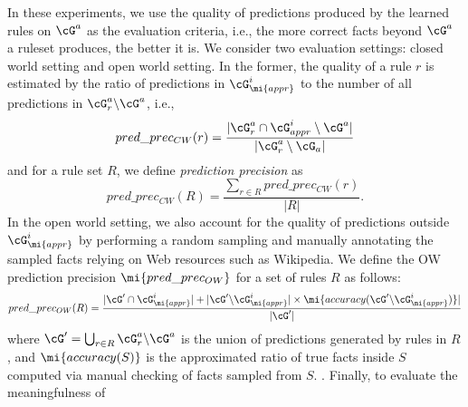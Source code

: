 In these experiments, we use the quality of predictions produced %
by the learned rules on $\cG^a$ as the evaluation criteria, i.e., the more correct facts %
beyond %
$\cG^a$ a ruleset produces, the better it is. %
We consider two evaluation settings: closed world setting and open world setting. In the former, the quality of a rule $r$ is estimated by the ratio of predictions in $\cG^i_{\mi{appr}}$ to the number of all predictions in $\cG^a_r\backslash \cG^a$, i.e., 
 \[   pred\_prec_{CW}(r) = \frac{|\cG^a_r \cap \cG^i_{appr} \setminus \cG^a|}{|\cG^a_r \setminus \cG_a|}\]
and for a rule set $R$, we define \textit{prediction precision} as
 \[   pred\_prec_{CW}(R) = \frac{\sum\limits_{r\in R} pred\_prec_{CW}(r)}{|R|}.\]
In the open world setting, we also account for the quality of predictions outside $\cG^i_{\mi{appr}}$ by performing a random sampling and manually annotating the sampled facts relying on Web resources such as Wikipedia. %
We define the OW prediction precision $\mi{pred\_prec_{OW}}$ for a set of rules $R$ as follows:
\[pred\_prec_{OW}(R) = \frac{|\cG'\cap \cG^i_{\mi{appr}}|+|\cG'\backslash \cG^i_{\mi{appr}}|\times \mi{accuracy(\cG'\backslash \cG^i_{\mi{appr}})}|}{|\cG'|}\]
where $\cG'=\bigcup_{r\in R}\cG^a_r\backslash \cG^a$ is the union of predictions generated by rules in $R$, and $\mi{accuracy(S)}$ is the approximated ratio of true facts inside $S$ computed via manual checking of facts sampled from $S$.
. %
Finally, to evaluate the meaningfulness of %
